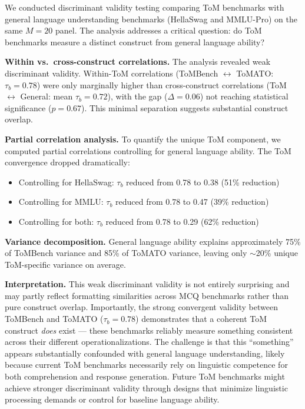\documentclass{article} %
\begin{document}
We conducted discriminant validity testing comparing ToM benchmarks with general language understanding benchmarks (HellaSwag and MMLU-Pro) on the same $M=20$ panel. The analysis addresses a critical question: do ToM benchmarks measure a distinct construct from general language ability?

\textbf{Within vs.\ cross-construct correlations.} The analysis revealed weak discriminant validity. Within-ToM correlations (ToMBench $\leftrightarrow$ ToMATO: $\tau_b=0.78$) were only marginally higher than cross-construct correlations (ToM $\leftrightarrow$ General: mean $\tau_b=0.72$), with the gap ($\Delta=0.06$) not reaching statistical significance ($p=0.67$). This minimal separation suggests substantial construct overlap.

\textbf{Partial correlation analysis.} To quantify the unique ToM component, we computed partial correlations controlling for general language ability. The ToM convergence dropped dramatically:
\begin{itemize}
\item Controlling for HellaSwag: $\tau_b$ reduced from 0.78 to 0.38 (51\% reduction)
\item Controlling for MMLU: $\tau_b$ reduced from 0.78 to 0.47 (39\% reduction)
\item Controlling for both: $\tau_b$ reduced from 0.78 to 0.29 (62\% reduction)
\end{itemize}

\textbf{Variance decomposition.} General language ability explains approximately 75\% of ToMBench variance and 85\% of ToMATO variance, leaving only $\sim$20\% unique ToM-specific variance on average.

\textbf{Interpretation.} This weak discriminant validity is not entirely surprising and may partly reflect formatting similarities across MCQ benchmarks rather than pure construct overlap. Importantly, the strong convergent validity between ToMBench and ToMATO ($\tau_b=0.78$) demonstrates that a coherent ToM construct \emph{does} exist --- these benchmarks reliably measure something consistent across their different operationalizations. The challenge is that this ``something'' appears substantially confounded with general language understanding, likely because current ToM benchmarks necessarily rely on linguistic competence for both comprehension and response generation. Future ToM benchmarks might achieve stronger discriminant validity through designs that minimize linguistic processing demands or control for baseline language ability.
\end{document}
